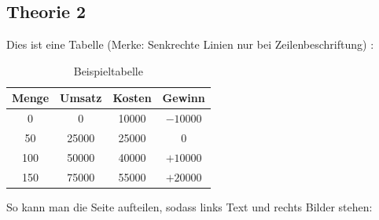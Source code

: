 \subsection{Theorie 2}
\label{sec:theorieB}

Dies ist eine Tabelle (Merke: Senkrechte Linien nur bei Zeilenbeschriftung)  :

\medskip
\begin{table}[!h]
	\centering
	{\renewcommand{\arraystretch}{1.5}
		\begin{tabular}{cccc}
			\toprule 
			Menge & Umsatz & Kosten & Gewinn \\ \midrule 
			0 & 0 & 10000 & $-10000$ \\ %
			50 & 25000 & 25000 & 0 \\ %
			100 & 50000 & 40000 & $+10000$ \\ %
			150 & 75000 & 55000 & $+20000$ \\
			\bottomrule 
		\end{tabular}
	}
	\caption{Beispieltabelle}
	\label{tab:BSP}
\end{table}

So kann man die Seite aufteilen, sodass links Text und rechts Bilder stehen:

\bigskip

